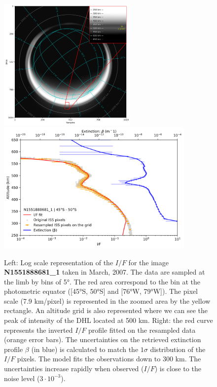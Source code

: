 \begin{figure}[!ht]
    \centering
    \includegraphics[height=6.5cm]{Fig/N1551888681_sampling.png}
    \includegraphics[height=6.5cm]{Fig/Model_uncertainties.png}
    \caption{Left: Log scale representation of the $I/F$  for the image
             \textbf{N1551888681\_1} taken in March, 2007. The data are sampled at the limb by
             bins of \ang{5}. The red area correspond to the bin at the photometric
             equator ([\ang{45}S, \ang{50}S] and [\ang{76}W, \ang{79}W]). The pixel scale
             (7.9 km/pixel) is represented in the zoomed area by the yellow rectangle.
             An altitude grid is also represented where we can see the peak of intensity of the DHL
             located at 500 km. Right: the red curve represents the inverted $I/F$ profile fitted
             on the resampled data (orange error bars). The uncertainties on the retrieved
             extinction profile $\beta$ (in blue) is calculated to match the $1 \sigma$ distribution
             of the $I/F$ pixels. The model fits the observations down to 300 km.
             The uncertainties increase rapidly when observed ($I/F$) is close
             to the noise level ($3\cdot10^{-3}$).}
    \label{fig:model_uncertainties}
\end{figure}
